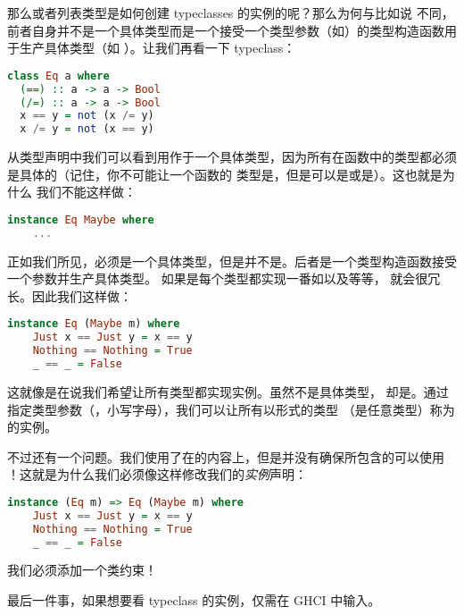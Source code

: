 \documentclass[./main.tex]{subfiles}
\begin{document}
那么或者列表类型是如何创建 typeclasses 的实例的呢？那么为何与比如说
不同，前者自身并不是一个具体类型而是一个接受一个类型参数（如）的类型构造函数用于生产具体类型（如
）。让我们再看一下 typeclass：

\begin{lstlisting}[language=Haskell]
  class Eq a where
  (==) :: a -> a -> Bool
  (/=) :: a -> a -> Bool
  x == y = not (x /= y)
  x /= y = not (x == y)
\end{lstlisting}

从类型声明中我们可以看到用作于一个具体类型，因为所有在函数中的类型都必须是具体的（记住，你不可能让一个函数的
类型是，但是可以是或是）。这也就是为什么
我们不能这样做：

\begin{lstlisting}[language=Haskell]
  instance Eq Maybe where
    ...
\end{lstlisting}

正如我们所见，必须是一个具体类型，但是并不是。后者是一个类型构造函数接受一个参数并生产具体类型。
如果是每个类型都实现一番如以及等等，
就会很冗长。因此我们这样做：

\begin{lstlisting}[language=Haskell]
  instance Eq (Maybe m) where
    Just x == Just y = x == y
    Nothing == Nothing = True
    _ == _ = False
\end{lstlisting}

这就像是在说我们希望让所有类型都实现实例。虽然不是具体类型，
却是。通过指定类型参数（，小写字母），我们可以让所有以形式的类型
（是任意类型）称为的实例。

不过还有一个问题。我们使用了\acode{==}在的内容上，但是并没有确保所包含的可以使用
！这就是为什么我们必须像这样修改我们的\textit{实例}声明：

\begin{lstlisting}[language=Haskell]
  instance (Eq m) => Eq (Maybe m) where
    Just x == Just y = x == y
    Nothing == Nothing = True
    _ == _ = False
\end{lstlisting}

我们必须添加一个类约束！

最后一件事，如果想要看 typeclass 的实例，仅需在 GHCI 中输入。
\end{document}
